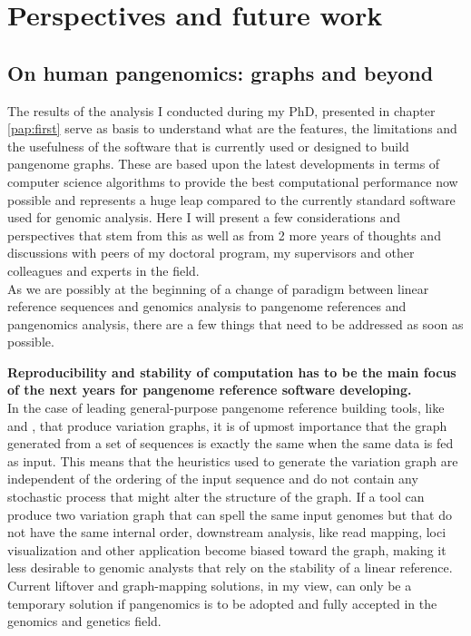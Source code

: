 
\chapter{Perspectives and future work}
\label{sec:perspectives}

\section{On human pangenomics: graphs and beyond}
The results of the analysis I conducted during my PhD, presented in chapter \ref{pap:first} serve as basis to understand what are the features, the limitations and the usefulness of the software that is currently used or designed to build pangenome graphs. These are based upon the latest developments in terms of computer science algorithms to provide the best computational performance now possible and represents a huge leap compared to the currently standard software used for genomic analysis.
Here I will present a few considerations and perspectives that stem from this as well as from 2 more years of thoughts and discussions with peers of my doctoral program, my supervisors and other colleagues and experts in the field. \\
As we are possibly at the beginning of a change of paradigm between linear reference sequences and genomics analysis to pangenome references and pangenomics analysis, there are a few things that need to be addressed as soon as possible. 

\textbf{Reproducibility and stability of computation has to be the main focus of the next years for pangenome reference software developing. \\}
In the case of leading general-purpose pangenome reference building tools, like \pggb and \mcactus, that produce variation graphs, it is of upmost importance that the graph generated from a set of sequences is exactly the same when the same data is fed as input. This means that the heuristics used to generate the variation graph are independent of the ordering of the input sequence and do not contain any stochastic process that might alter the structure of the graph. If a tool can produce two variation graph that can spell the same input genomes but that do not have the same internal order, downstream analysis, like read mapping, loci visualization and other application become biased toward the graph, making it less desirable to genomic analysts that rely on the stability of a linear reference. Current liftover and graph-mapping solutions, in my view, can only be a temporary solution if pangenomics is to be adopted and fully accepted in the genomics and genetics field.

